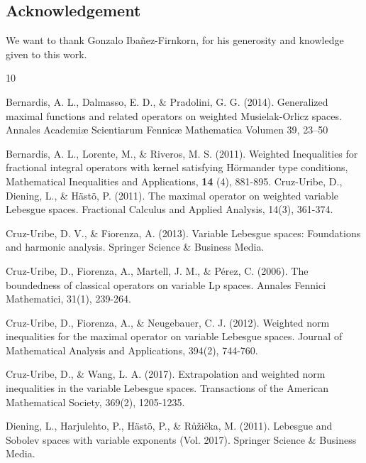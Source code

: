 \documentclass[a4paper,11pt,reqno]{amsart}
\theoremstyle{plain}
\numberwithin{equation}{section}
\theoremstyle{definition}
\begin{document}
\subsection*{Acknowledgement}
	We want to thank Gonzalo Ibañez-Firnkorn, for his generosity and knowledge given to this work.
\normalsize





\begin{thebibliography}{10}

\normalsize
\baselineskip=17pt


{Bernardis, A. L., Dalmasso, E. D., \& Pradolini, G. G.  (2014).{ Generalized maximal functions and related operators on weighted Musielak-Orlicz spaces.} Annales Academiæ Scientiarum Fennicæ Mathematica Volumen 39, 23–50 
}

{Bernardis, A. L., Lorente, M., \& Riveros, M. S. (2011). {Weighted Inequalities for fractional integral operators with kernel satisfying H\"{o}rmander type conditions},   Mathematical Inequalities and Applications,
	\textbf{14} (4), 881-895.
}
{Cruz-Uribe, D., Diening, L., \& Hästö, P. (2011). The maximal operator on weighted variable Lebesgue spaces. Fractional Calculus and Applied Analysis, 14(3), 361-374.
}

{Cruz-Uribe, D. V., \& Fiorenza, A. (2013). Variable Lebesgue spaces: Foundations and harmonic analysis. Springer Science \& Business Media.
}

{Cruz-Uribe, D., Fiorenza, A., Martell, J. M., \& Pérez, C. (2006). The boundedness of classical operators on variable Lp spaces. Annales Fennici Mathematici, 31(1), 239-264.
}

{
	Cruz-Uribe, D., Fiorenza, A., \& Neugebauer, C. J. (2012). Weighted norm inequalities for the maximal operator on variable Lebesgue spaces. Journal of Mathematical Analysis and Applications, 394(2), 744-760.
	
}

{Cruz-Uribe, D., \& Wang, L. A. (2017). Extrapolation and weighted norm inequalities in the variable Lebesgue spaces. Transactions of the American Mathematical Society, 369(2), 1205-1235.
}

Diening, L., Harjulehto, P., Hästö, P., \& Růžička, M. (2011). Lebesgue and Sobolev spaces with variable exponents (Vol. 2017). Springer Science \& Business Media.


\end{thebibliography}
\end{document}
